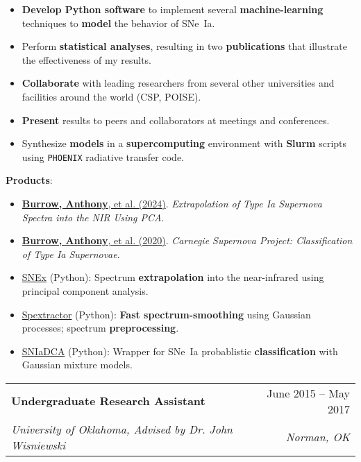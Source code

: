 \documentclass[letterpaper,11pt]{article}
\makeatletter
\newcommand{\smallHeading}[1]{\small{\textbf{#1}:\vspace{-5pt}}}
\newcommand{\resumeSubheading}[4]{
  \vspace{-1pt}\item
    \begin{tabular*}{0.97\textwidth}{l@{\extracolsep{\fill}}r}
      \textbf{#1} & #2 \\
      \textit{\small#3} & \textit{\small #4} \\
    \end{tabular*}\vspace{-5pt}
}
\newcommand{\paperEntryShort}[4]{
  \href{https://doi.org/#1}{\textbf{Burrow, Anthony}, et al. (#2)}.
  \textit{#3}. #4
}
\newcommand{\emphasize}[1]{\textbf{#1}}
\makeatother
\begin{document}
    \begin{itemize}\small
      \item \emphasize{Develop Python software} to implement several
        \emphasize{machine-learning} techniques to \emphasize{model} the
        behavior of SNe~Ia.
      \item Perform \emphasize{statistical analyses}, resulting in two
        \emphasize{publications} that illustrate the effectiveness of my
        results.
      \item \emphasize{Collaborate} with leading researchers from several other
        universities and facilities around the world (CSP, POISE).
      \item \emphasize{Present} results to peers and collaborators at meetings
        and conferences.
      \item Synthesize \emphasize{models} in a \emphasize{supercomputing}
        environment with \emphasize{Slurm} scripts using \texttt{PHOENIX}
        radiative transfer code.
    \end{itemize}
    \hspace*{1.1em}\smallHeading{Products}
    \begin{itemize}\small
      \item \paperEntryShort{10.3847/1538-4357/ad3c45}{2024}
            {Extrapolation of Type Ia Supernova Spectra into the NIR Using PCA}
            {\apj}
      \item \paperEntryShort{10.3847/1538-4357/abafa2}{2020}
            {Carnegie Supernova Project: Classification of Type Ia Supernovae}
            {\apj}
      \item \href{https://github.com/anthonyburrow/SNEx}{SNEx} (Python):
        Spectrum \emphasize{extrapolation} into the near-infrared using
        principal component analysis.
      \item \href{https://github.com/anthonyburrow/spextractor}{Spextractor} (Python):
        \emphasize{Fast spectrum-smoothing} using Gaussian processes; spectrum
        \emphasize{preprocessing}.
      \item \href{https://github.com/anthonyburrow/SNIaDCA}{SNIaDCA} (Python):
        Wrapper for SNe~Ia probablistic \emphasize{classification} with
        Gaussian mixture models.
    \end{itemize}\vspace{-5pt}

  \normalsize
  \resumeSubheading
    {Undergraduate Research Assistant}{June 2015 -- May 2017}
    {University of Oklahoma, Advised by Dr. John Wisniewski}{Norman, OK}
\end{document}
